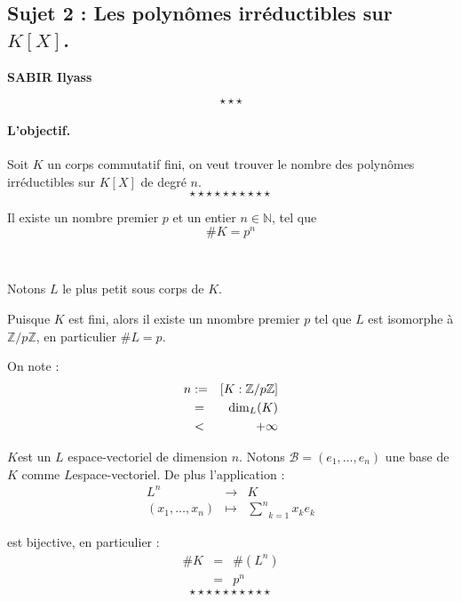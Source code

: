 \begin{center}
\subsection*{Sujet 2 : Les polyn{\^o}mes irr{\'e}ductibles sur $K [X]$.}\label{sjt2}
\textbf{SABIR Ilyass}
\end{center}
\[ \star \star \star \]
\paragraph{L'objectif.}

Soit $K$ un corps commutatif fini, on veut trouver le nombre des polyn{\^o}mes
irr{\'e}ductibles sur $K [X]$ de degr{\'e} $n$.
\[ \star \star \star \star \star \star \star \star \star \star \]



Il existe un nombre premier $p$ et un entier $n \in \mathbb{N}$, tel que
\[ \#K = p^n \]



\

Notons $L$ le plus petit sous corps de $K$.

Puisque $K$ est fini, alors il existe un nnombre premier $p$ tel que $L$ est
isomorphe {\`a} $\mathbb{Z}/ p\mathbb{Z}$, en particulier $\#L = p$.

On note :
\begin{eqnarray*}
  n & := & [K : \mathbb{Z}/ p\mathbb{Z}]\\
  & = & \dim_L (K)\\
  & < & + \infty
\end{eqnarray*}


$K$est un $L$ espace-vectoriel de dimension $n$. Notons $\mathcal{B}= (e_1,
\ldots, e_n)$ une base de $K$ comme $L$espace-vectoriel. De plus l'application
:
\[ \begin{array}{ccc}
     L^n & \rightarrow & K\\
     (x_1, \ldots, x_n) & \longmapsto & \underset{k = 1}{\overset{n}{\sum}}
     x_k e_k
   \end{array} \]


est bijective, en particulier :
\begin{eqnarray*}
  \#K & = & \# (L^n)\\
  & = & p^n
\end{eqnarray*}
\[ \star \star \star \star \star \star \star \star \star \star \]


